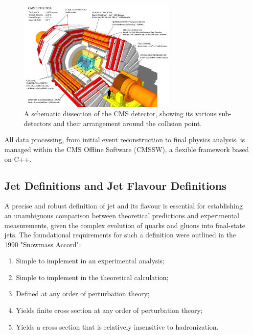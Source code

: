 \documentclass[10pt,twocolumn]{article}
\begin{document}
\begin{figure}[!bth]
    \centering
    \includegraphics[width=0.70\textwidth]{images/CMS_disection_Run2.png}
    \caption{A schematic dissection of the CMS detector, showing its various sub-detectors and their arrangement around the collision point.\cite{CMS_CUTAWAY_DIAGRAM}}
    \label{fig:CMS_disection}
\end{figure}

All data processing, from initial event reconstruction to final physics analysis, is managed within the CMS Offline Software (CMSSW), a flexible framework based on C++. 

\subsection{Jet Definitions and Jet Flavour Definitions}
\label{sec:intro-jetdef}

A precise and robust definition of jet and its flavour is essential for establishing an unambiguous comparison between theoretical predictions and experimental measurements, given the complex evolution of quarks and gluons into final-state jets. The foundational requirements for such a definition were outlined in the 1990 "Snowmass Accord"\cite{bergerStandardizationJetDefinitions1992_Snowmass1990}:

\begin{enumerate}
    \item Simple to implement in an experimental analysis;
    \item Simple to implement in the theoretical calculation;
    \item Defined at any order of perturbation theory;
    \item Yields finite cross section at any order of perturbation theory;
    \item Yields a cross section that is relatively insensitive to hadronization.
\end{enumerate}
\end{document}
